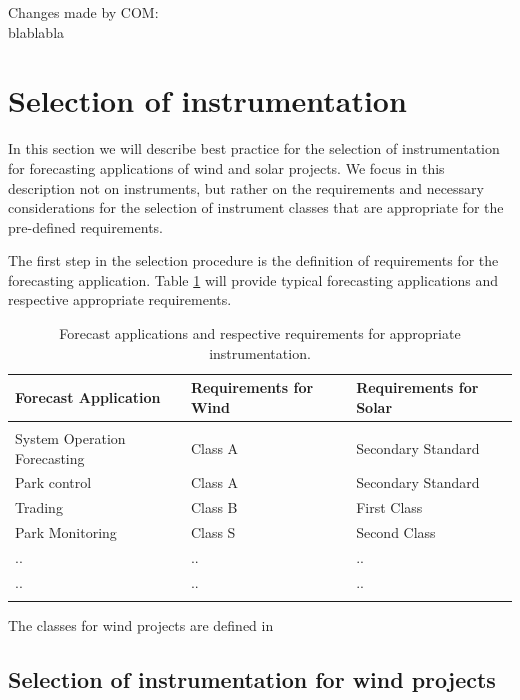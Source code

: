 \color{purple}
Changes made by COM: \\
blablabla
\color{black}
\fi

\section{Selection of instrumentation}\label{sec:instrumentation_selection}

{\color{blue}{Comments from SW (28.06.2021: also include comments on how representative the measurements of different instruments are}}

In this section we will describe best practice for the selection of instrumentation for forecasting applications of wind and solar projects. 
We focus in this description not on instruments, but rather on the requirements and necessary considerations for the selection of instrument classes that are appropriate for the pre-defined requirements. 

The first step in the selection procedure is the definition of requirements for the forecasting application. Table \ref{tab:requirements_on_instrumentaion} will provide typical forecasting applications and respective appropriate requirements. 

\begin{longtable}{  p{} | p{} |  p{} }
 \caption{Forecast applications and respective requirements for appropriate instrumentation.}\\
 \hline
 \textbf{Forecast Application} & \textbf{Requirements for Wind} & \textbf{Requirements for Solar}\\ \hline
 \endfirsthead
 \textbf{} & \textbf{} &  \\ \hline
 \endhead
System Operation Forecasting &  Class A & Secondary Standard\\ 
Park control & Class A & Secondary Standard\\ 
Trading & Class B & First Class \\ 
Park Monitoring & Class S & Second Class \\ 
.. & .. & .. \\ 
.. & .. & .. \\ \hline
  \label{tab:requirements_on_instrumentaion}
\end{longtable}

The classes for wind projects are defined in 

\subsection{Selection of instrumentation for wind projects}\label{subsec:instrumentation_selection}

